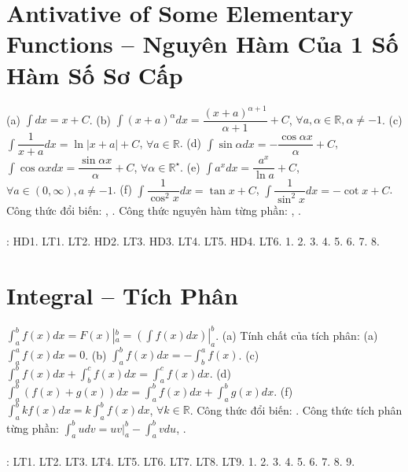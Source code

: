 \documentclass{article}
\begin{document}

\section{Antivative of Some Elementary Functions -- Nguyên Hàm Của 1 Số Hàm Số Sơ Cấp}
 (a) $\int dx = x + C$. (b) $\int (x + a)^\alpha dx = \dfrac{(x + a)^{\alpha + 1}}{\alpha + 1} + C$, $\forall a,\alpha\in\mathbb{R},\alpha\ne-1$. (c) $\int \dfrac{1}{x + a}dx = \ln|x + a| + C$, $\forall a\in\mathbb{R}$. (d) $\int \sin\alpha dx = -\dfrac{\cos\alpha x}{\alpha} + C$, $\int \cos\alpha xdx = \dfrac{\sin\alpha x}{\alpha} + C$, $\forall\alpha\in\mathbb{R}^\star$. (e) $\int a^xdx = \dfrac{a^x}{\ln a} + C$, $\forall a\in(0,\infty),a\ne-1$. (f) $\int \dfrac{1}{\cos^2x}dx = \tan x + C$, $\int\dfrac{1}{\sin^2x}dx = -\cot x + C$.  {\sf Công thức đổi biến}: , .  {\sf Công thức nguyên hàm từng phần}: , .\\
\\
\cite[Chap. IV, \S2, pp. 9--16]{SGK_Toan_12_Canh_Dieu_tap_2}: HD1. LT1. LT2. HD2. LT3. HD3. LT4. LT5. HD4. LT6. 1. 2. 3. 4. 5. 6. 7. 8.


\section{Integral -- Tích Phân}
 $\int_a^b f(x)dx = F(x)|_a^b = \left(\int f(x)dx\right)|_a^b$.  (a) {\sf Tính chất của tích phân}: (a) $\int_a^a f(x)dx = 0$. (b) $\int_a^b f(x)dx = -\int_b^a f(x)$. (c) $\int_a^b f(x)dx + \int_b^c f(x)dx = \int_a^c f(x)dx$. (d) $\int_a^b (f(x) + g(x))dx = \int_a^b f(x)dx + \int_a^b g(x)dx$. (f) $\int_a^b kf(x)dx = k\int_a^b f(x)dx$, $\forall k\in\mathbb{R}$.  {\sf Công thức đổi biến}: .  {\sf Công thức tích phân từng phần}: $\int_a^b udv = uv|_a^b - \int_a^b vdu$, .\\
\\
\noindent\cite[Chap. IV, \S3, pp. 17--27]{SGK_Toan_12_Canh_Dieu_tap_2}: LT1. LT2. LT3. LT4. LT5. LT6. LT7. LT8. LT9. 1. 2. 3. 4. 5. 6. 7. 8. 9.
\end{document}
